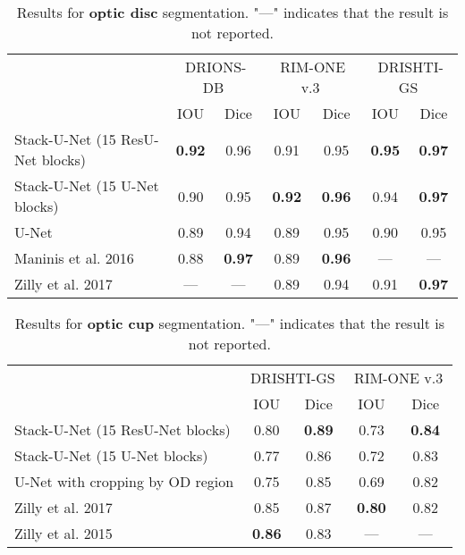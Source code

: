 \documentclass{llncs}
\begin{document}
\begin{table}[ht!]
            \centering
        	\begin{tabular}{l|c|c|c|c|c|c}
        		\hline
        		& \multicolumn{2}{c|}{\,DRIONS-DB\,} &
        		\multicolumn{2}{c|}{\,RIM-ONE v.3\,} &
        		\multicolumn{2}{c}{\,DRISHTI-GS\,} \\
        		& IOU & Dice & IOU & Dice & IOU & Dice \\ \hline \hline
        		Stack-U-Net (15 ResU-Net blocks) & \textbf{0.92} & 0.96 & 0.91 & 0.95 & \textbf{0.95} & \textbf{0.97} \\
                Stack-U-Net (15 U-Net blocks) & 0.90 & 0.95 & \textbf{0.92} & \textbf{0.96} & 0.94 & \textbf{0.97} \\
                \hline
        		U-Net \cite{sevastopolsky2017optic} & 0.89 & 0.94 & 0.89 & 0.95 & 0.90 & 0.95 \\
                
        		Maninis et al. 2016 \cite{driu} & 0.88 & \textbf{0.97} & 0.89 & \textbf{0.96} & --- & --- \\
        		Zilly et al. 2017 \cite{zilly2017glaucoma} & --- & --- & 0.89 & 0.94 & 0.91 & \textbf{0.97} \\ \hline
        	\end{tabular}
            \newline\newline
        	\caption{Results for \textbf{optic disc} segmentation. "---" indicates that the result is not reported.}
            \label{table:optic_disc_results}
\end{table}


\begin{table}[ht!]
        	\centering
        	\begin{tabular}{l|c|c|c|c}
        		\hline
        		& \multicolumn{2}{c|}{\,DRISHTI-GS\,} &
        		\multicolumn{2}{c}{\,RIM-ONE v.3\,} \\   %
        		& IOU & Dice & IOU & Dice \\ \hline \hline
        		Stack-U-Net (15 ResU-Net blocks) & 0.80 & \textbf{0.89} & 0.73 & \textbf{0.84} \\
                Stack-U-Net (15 U-Net blocks) & 0.77 & 0.86 & 0.72 & 0.83 \\  
                \hline
        		U-Net with cropping by OD region 
                \cite{sevastopolsky2017optic} & 0.75 & 0.85 & 0.69 & 0.82 \\
        		Zilly et al. 2017 \cite{zilly2017glaucoma} & 0.85 & 0.87 & \textbf{0.80} & 0.82 \\
        		Zilly et al. 2015 \cite{zilly2015boosting} & \textbf{0.86} & 0.83 & --- & --- \\ \hline
        	\end{tabular}
            \newline\newline
        	\caption{Results for \textbf{optic cup} segmentation. "---" indicates that the result is not reported.}
            \label{table:optic_cup_results}
\end{table}
\end{document}
